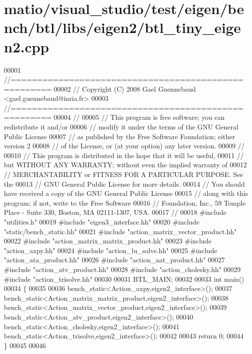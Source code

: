 \hypertarget{matio_2visual__studio_2test_2eigen_2bench_2btl_2libs_2eigen2_2btl__tiny__eigen2_8cpp_source}{}\section{matio/visual\+\_\+studio/test/eigen/bench/btl/libs/eigen2/btl\+\_\+tiny\+\_\+eigen2.cpp}
\label{matio_2visual__studio_2test_2eigen_2bench_2btl_2libs_2eigen2_2btl__tiny__eigen2_8cpp_source}

\begin{DoxyCode}
00001 \textcolor{comment}{//=====================================================}
00002 \textcolor{comment}{// Copyright (C) 2008 Gael Guennebaud <gael.guennebaud@inria.fr>}
00003 \textcolor{comment}{//=====================================================}
00004 \textcolor{comment}{//}
00005 \textcolor{comment}{// This program is free software; you can redistribute it and/or}
00006 \textcolor{comment}{// modify it under the terms of the GNU General Public License}
00007 \textcolor{comment}{// as published by the Free Software Foundation; either version 2}
00008 \textcolor{comment}{// of the License, or (at your option) any later version.}
00009 \textcolor{comment}{//}
00010 \textcolor{comment}{// This program is distributed in the hope that it will be useful,}
00011 \textcolor{comment}{// but WITHOUT ANY WARRANTY; without even the implied warranty of}
00012 \textcolor{comment}{// MERCHANTABILITY or FITNESS FOR A PARTICULAR PURPOSE.  See the}
00013 \textcolor{comment}{// GNU General Public License for more details.}
00014 \textcolor{comment}{// You should have received a copy of the GNU General Public License}
00015 \textcolor{comment}{// along with this program; if not, write to the Free Software}
00016 \textcolor{comment}{// Foundation, Inc., 59 Temple Place - Suite 330, Boston, MA  02111-1307, USA.}
00017 \textcolor{comment}{//}
00018 \textcolor{preprocessor}{#include "utilities.h"}
00019 \textcolor{preprocessor}{#include "eigen3\_interface.hh"}
00020 \textcolor{preprocessor}{#include "static/bench\_static.hh"}
00021 \textcolor{preprocessor}{#include "action\_matrix\_vector\_product.hh"}
00022 \textcolor{preprocessor}{#include "action\_matrix\_matrix\_product.hh"}
00023 \textcolor{preprocessor}{#include "action\_axpy.hh"}
00024 \textcolor{preprocessor}{#include "action\_lu\_solve.hh"}
00025 \textcolor{preprocessor}{#include "action\_ata\_product.hh"}
00026 \textcolor{preprocessor}{#include "action\_aat\_product.hh"}
00027 \textcolor{preprocessor}{#include "action\_atv\_product.hh"}
00028 \textcolor{preprocessor}{#include "action\_cholesky.hh"}
00029 \textcolor{preprocessor}{#include "action\_trisolve.hh"}
00030 
00031 BTL\_MAIN;
00032 
00033 \textcolor{keywordtype}{int} main()
00034 \{
00035 
00036   bench\_static<Action\_axpy,eigen2\_interface>();
00037   bench\_static<Action\_matrix\_matrix\_product,eigen2\_interface>();
00038   bench\_static<Action\_matrix\_vector\_product,eigen2\_interface>();
00039   bench\_static<Action\_atv\_product,eigen2\_interface>();
00040   bench\_static<Action\_cholesky,eigen2\_interface>();
00041   bench\_static<Action\_trisolve,eigen2\_interface>();
00042 
00043   \textcolor{keywordflow}{return} 0;
00044 \}
00045 
00046 
\end{DoxyCode}
